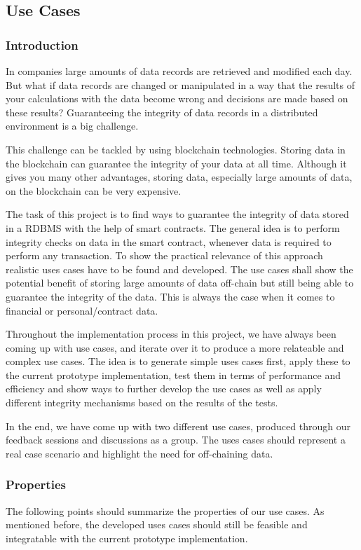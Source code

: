 \subsection{Use Cases} \label{sssec:use_cases}

\subsubsection{Introduction}
In companies large amounts of data records are retrieved and modified each day. But what if data records are changed or manipulated in a way that the results of your calculations with the data become wrong and decisions are made based on these results? Guaranteeing the integrity of data records in a distributed environment is a big challenge.

This challenge can be tackled by using blockchain technologies. Storing data in the blockchain can guarantee the integrity of your data at all time. Although it gives you many other advantages, storing data, especially large amounts of data, on the blockchain can be very expensive.

The task of this project is to find ways to guarantee the integrity of data stored in a RDBMS with the help of smart contracts. The general idea is to perform integrity checks on data in the smart contract, whenever data is required to perform any transaction. To show the practical relevance of this approach realistic uses cases have to be found and developed. The use cases shall show the potential benefit of storing large amounts of data off-chain but still being able to guarantee the integrity of the data. This is always the case when it comes to financial or personal/contract data.

Throughout the implementation process in this project, we have always been coming up with use cases, and iterate over it to produce a more relateable and complex use cases. The idea is to generate simple uses cases first, apply these to the current prototype implementation, test them in terms of performance and efficiency and show ways to further develop the use cases as well as apply different integrity mechanisms based on the results of the tests.

In the end, we have come up with two different use cases, produced through our feedback sessions and discussions as a group. The uses cases should represent a real case scenario and highlight the need for off-chaining data.

\subsubsection{Properties}
The following points should summarize the properties of our use cases. As mentioned before, the developed uses cases should still be feasible and integratable with the current prototype implementation. 

